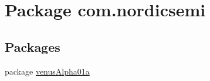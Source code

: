 \hypertarget{namespacecom_1_1nordicsemi}{}\section{Package com.\+nordicsemi}
\label{namespacecom_1_1nordicsemi}
\subsection*{Packages}
\begin{DoxyCompactItemize}
\item 
package \hyperlink{namespacecom_1_1nordicsemi_1_1venus_alpha01a}{venus\+Alpha01a}
\end{DoxyCompactItemize}
